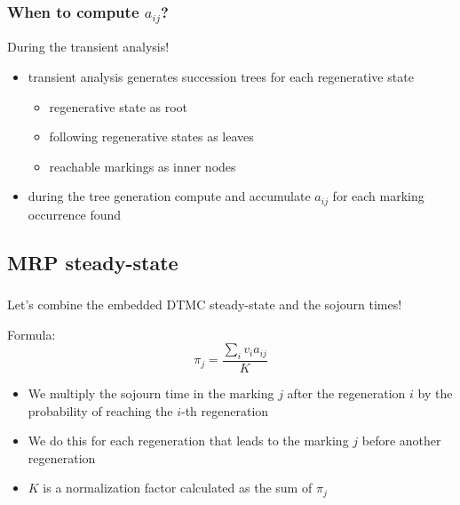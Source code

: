 \begin{frame}
  \frametitle{When to compute $a_{ij}$?}
  \alert{During} the transient analysis!
  \pause
  \begin{itemize}
  \item transient analysis generates \alert{succession trees} for each
    regenerative state
    \pause
    \begin{itemize}
    \item regenerative state as \alert{root}
    \item following regenerative states as \alert{leaves}
    \item reachable markings as inner \alert{nodes}
      \pause
    \end{itemize}
  \item during the \alert{tree generation} compute and accumulate $a_{ij}$ for
    each marking occurrence found
  \end{itemize}
\end{frame}
\subsection{\acf{MRP} steady-state}
\begin{frame}
  \frametitle{\insertsubsection}
  Let's \alert{combine} the embedded \acs{DTMC} steady-state and the sojourn
  times!
  \pause
  \begin{center}
    \begin{minipage}{4cm}
      \begin{block}{Formula:}
        \begin{equation*}
          \pi_j = \frac{\sum_i v_i a_{ij}}{K}
        \end{equation*}
      \end{block}
    \end{minipage}
  \end{center}
  \pause
  \begin{itemize}
  \item We \alert{multiply} the \alert{sojourn} time in the marking \alert{$j$} after the
    regeneration \alert{$i$} by the \alert{probability} of reaching the \alert{$i$}-th regeneration
    \pause
  \item We do this for \alert{each} regeneration that \alert{leads} to the marking \alert{$j$}
    before another regeneration
    \pause
  \item \alert{$K$} is a \alert{normalization} factor calculated as the sum of \alert{$\pi_j$}
  \end{itemize}
\end{frame}
